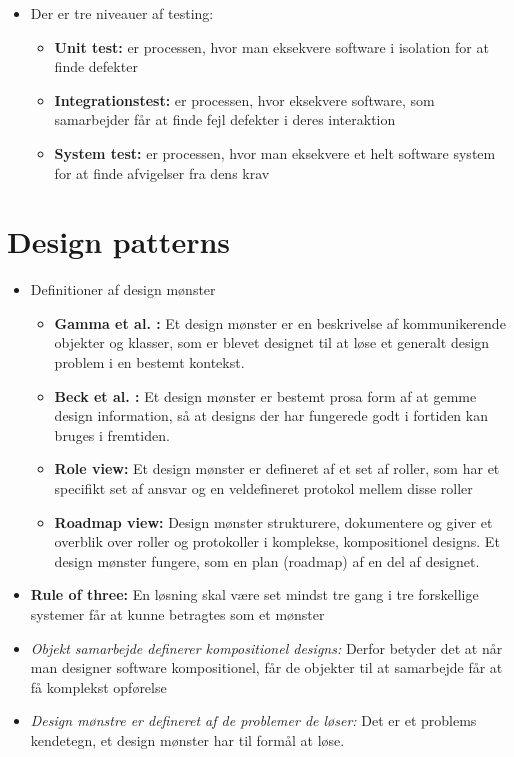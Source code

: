\documentclass[a4, english]{article}
\begin{document}
\begin{itemize}
\begin{itemize}
  \end{itemize}
  \item Der er tre niveauer af testing:
  \begin{itemize}
  	\item \textbf{Unit test:} er processen, hvor man eksekvere software i isolation for at finde defekter 
    \item \textbf{Integrationstest:} er processen, hvor eksekvere software, som samarbejder får at finde fejl defekter i deres interaktion 
    \item \textbf{System test:} er processen, hvor man eksekvere et helt software system for at finde afvigelser fra dens krav
  \end{itemize}
\end{itemize}
\newpage

\section{Design patterns}
\begin{itemize}
	\item Definitioner af design mønster
  \begin{itemize}
  	\item \textbf{Gamma et al. :} Et design mønster er en beskrivelse af kommunikerende objekter og klasser, som er blevet designet til at løse et generalt design problem i en bestemt kontekst.
    \item \textbf{Beck et al. :} Et design mønster er bestemt prosa form af at gemme design information, så at designs der har fungerede godt i fortiden kan bruges i fremtiden. 
    \item \textbf{Role view: } Et design mønster er defineret af et set af roller, som har et specifikt set af ansvar og en veldefineret protokol mellem disse roller
    \item \textbf{Roadmap view:} Design mønster strukturere, dokumentere og giver et overblik over roller og protokoller i komplekse, kompositionel designs. Et design mønster fungere, som en plan (roadmap) af en del af designet. 
  \end{itemize}
  \item \textbf{Rule of three: } En løsning skal være set mindst tre gang i tre forskellige systemer får at kunne betragtes som et mønster 
  \item \textit{Objekt samarbejde definerer kompositionel designs:} Derfor betyder det at når man designer software kompositionel, får de objekter til at samarbejde får at få komplekst opførelse
  \item \textit{Design mønstre er defineret af de problemer de løser: } Det er et problems kendetegn, et design mønster har til formål at løse. 
\end{itemize}
  
\end{document}
